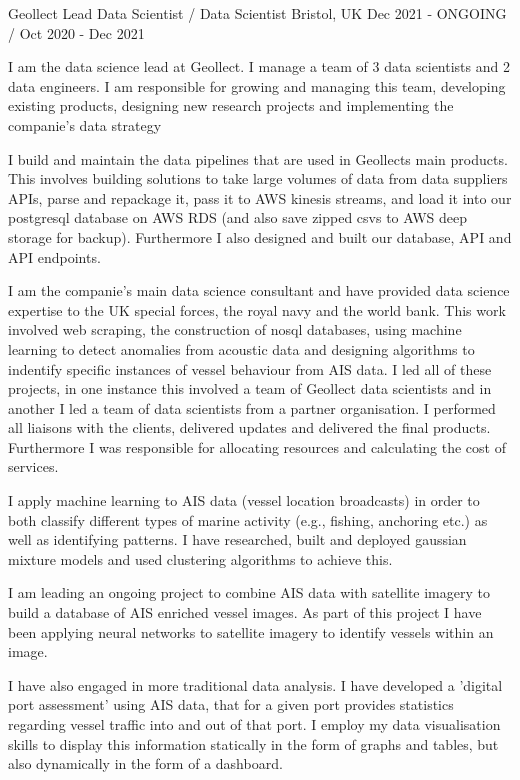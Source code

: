 \begin{cventries}
  \cventry
    {Geollect}
    {Lead Data Scientist / Data Scientist}
    {Bristol, UK}
    {Dec 2021 - ONGOING / Oct 2020 - Dec 2021}
    {
      \begin{cvitems}
        \item {I am the data science lead at Geollect. I manage a team of 3 data scientists and 2 data engineers. I am responsible for growing and managing this team, developing existing products, designing new research projects and implementing the companie's data strategy}
        \item {I build and maintain the data pipelines that are used in Geollects main products. This involves building solutions to take large volumes of data from data suppliers APIs, parse and repackage it, pass it to AWS kinesis streams, and load it into our postgresql database on AWS RDS (and also save zipped csvs to AWS deep storage for backup). Furthermore I also designed and built our database, API and API endpoints.}
        \item {I am the companie's main data science consultant and have provided data science expertise to the UK special forces, the royal navy and the world bank. This work involved web scraping, the construction of nosql databases, using machine learning to detect anomalies from acoustic data and designing algorithms to indentify specific instances of vessel behaviour from AIS data. I led all of these projects, in one instance this involved a team of Geollect data scientists and in another I led a team of data scientists from a partner organisation. I performed all liaisons with the clients, delivered updates and delivered the final products. Furthermore I was responsible for allocating resources and calculating the cost of services.}
        \item {I apply machine learning to AIS data (vessel location broadcasts) in order to both classify different types of marine activity (e.g., fishing, anchoring etc.) as well as identifying patterns. I have researched, built and deployed gaussian mixture models and used clustering algorithms to achieve this.}
        \item {I am leading an ongoing project to combine AIS data with satellite imagery to build a database of AIS enriched vessel images. As part of this project I have been applying neural networks to satellite imagery to identify vessels within an image.}
        \item {I have also engaged in more traditional data analysis. I have developed a 'digital port assessment' using AIS data, that for a given port provides statistics regarding vessel traffic into and out of that port. I employ my data visualisation skills to display this information statically in the form of graphs and tables, but also dynamically in the form of a dashboard.}

\end{cvitems}}
\end{cventries}
